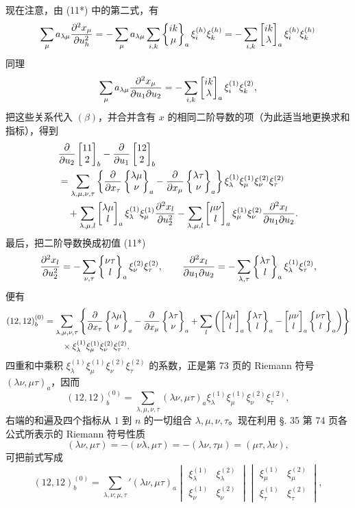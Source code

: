 现在注意，由 (11*) 中的第二式，有
\[
 \sum_{\mu}a_{\lambda\mu}\frac{\partial^2x_\mu}{\partial u_h^2}
 =-\sum_{\mu}a_{\lambda\mu}\sum_{i,k}\left\{\begin{matrix}ik\\\mu\end{matrix}\right\}_{a}\xi_i^{(h)}\xi_k^{(h)}
 =-\sum_{i,k}\left[\begin{matrix}ik\\\lambda\end{matrix}\right]_{a}\xi_i^{(h)}\xi_k^{(h)}
\]
同理
\[
 \sum_{\mu}a_{\lambda\mu}\frac{\partial^2x_\mu}{\partial u_1\partial u_2}
 =-\sum_{i,k}\left[\begin{matrix}ik\\\lambda\end{matrix}\right]_{a}\xi_i^{(1)}\xi_k^{(2)},
\]
把这些关系代入 \((\beta)\)，并合并含有 \(x\) 的相同二阶导数的项（为此适当地更换求和指标），得到
\[
\begin{aligned}
&\frac{\partial}{\partial u_2}\left[\begin{matrix}11\\2\end{matrix}\right]_{b}-
 \frac{\partial}{\partial u_1}\left[\begin{matrix}12\\2\end{matrix}\right]_{b} \\
&=\sum_{\lambda,\mu,\nu,\tau}\left\{
 \frac{\partial}{\partial x_\tau}\left\{\begin{matrix}\lambda\mu\\\nu\end{matrix}\right\}_{a}-
 \frac{\partial}{\partial x_\mu}\left\{\begin{matrix}\lambda\tau\\\nu\end{matrix}\right\}_{a}\right\}
 \xi_\lambda^{(1)}\xi_\mu^{(1)}\xi_\nu^{(2)}\xi_\tau^{(2)} \\
&\quad +\sum_{\lambda,\mu,l}\left[\begin{matrix}\lambda\mu\\l\end{matrix}\right]_{a}\xi_\lambda^{(1)}\xi_\mu^{(1)}\frac{\partial^2x_l}{\partial u_2^2}
 -\sum_{\lambda,\mu,l}\left[\begin{matrix}\mu\nu\\l\end{matrix}\right]_{a}\xi_\mu^{(1)}\xi_\nu^{(2)}\frac{\partial^2x_l}{\partial u_1\partial u_2}.
\end{aligned}
\]
最后，把二阶导数换成初值 (11*)
\[
 \frac{\partial^2x_l}{\partial u_2^2}=-\sum_{\nu,\tau}\left\{\begin{matrix}\nu\tau\\l\end{matrix}\right\}_{a}\xi_\nu^{(2)}\xi_\tau^{(2)},
\qquad
 \frac{\partial^2x_l}{\partial u_1\partial u_2}=-\sum_{\lambda,\tau}\left\{\begin{matrix}\lambda\tau\\l\end{matrix}\right\}_{a}\xi_\lambda^{(1)}\xi_\tau^{(2)},
\]
便有
\[
\begin{aligned}
(12,12)_b^{(0)}&=\sum_{\lambda,\mu,\nu,\tau}\left\{\frac{\partial}{\partial x_\tau}\left\{\begin{matrix}\lambda\mu\\\nu\end{matrix}\right\}_{a}-\frac{\partial}{\partial x_\mu}\left\{\begin{matrix}\lambda\tau\\\nu\end{matrix}\right\}_{a}
 +\sum_l\left(\left[\begin{matrix}\lambda\mu\\l\end{matrix}\right]_{a}\left\{\begin{matrix}\lambda\tau\\l\end{matrix}\right\}_{a}-\left[\begin{matrix}\mu\nu\\l\end{matrix}\right]_{a}\left\{\begin{matrix}\nu\tau\\l\end{matrix}\right\}_{a}\right)\right\} \\
&\qquad\times \xi_\lambda^{(1)}\xi_\mu^{(1)}\xi_\nu^{(2)}\xi_\tau^{(2)}.
\end{aligned}
\]
四重和中乘积 \(\xi_\lambda^{(1)}\xi_\mu^{(1)}\xi_\nu^{(2)}\xi_\tau^{(2)}\) 的系数，正是第 73 页的 Riemann 符号 \((\lambda\nu,\mu\tau)_a\)，因而
\[
 (12,12)_b^{(0)}=\sum_{\lambda,\mu,\nu,\tau}(\lambda\nu,\mu\tau)_a\xi_\lambda^{(1)}\xi_\mu^{(1)}\xi_\nu^{(2)}\xi_\tau^{(2)},
\]
右端的和遍及四个指标从 \(1\) 到 \(n\) 的一切组合 \(\lambda,\mu,\nu,\tau\)。现在利用 \S. 35 第 74 页各公式所表示的 Riemann 符号性质
\[
 (\lambda\nu,\mu\tau)=-(\nu\lambda,\mu\tau)=-(\lambda\nu,\tau\mu)=(\mu\tau,\lambda\nu),
\]
可把前式写成
\[
 (12,12)_b^{(0)}=\sum_{\lambda,\nu;\mu,\tau}'(\lambda\nu,
\mu\tau)_a
 \begin{vmatrix}\xi_\lambda^{(1)}&\xi_\lambda^{(2)}\\\xi_\nu^{(1)}&\xi_\nu^{(2)}\end{vmatrix}
 \begin{vmatrix}\xi_\mu^{(1)}&\xi_\mu^{(2)}\\\xi_\tau^{(1)}&\xi_\tau^{(2)}\end{vmatrix},
\]
